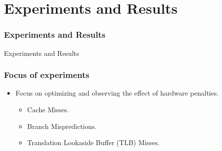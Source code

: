 \documentclass{beamer}
\begin{document}
\section{Experiments and Results}
\begin{frame}
\frametitle{Experiments and Results}
\huge{Experiments and Results}
\end{frame}


\begin{frame}
\frametitle{Focus of experiments}
\begin{itemize}
\setlength\itemsep{1em}
\item Focus on optimizing and observing the effect of hardware penalties.
	\begin{itemize}
	\setlength\itemsep{1em}
	\item Cache Misses.
	\item Branch Mispredictions.
	\item Translation Lookaside Buffer (TLB) Misses.
	\end{itemize}
\end{itemize}
\end{frame}

\end{document}
